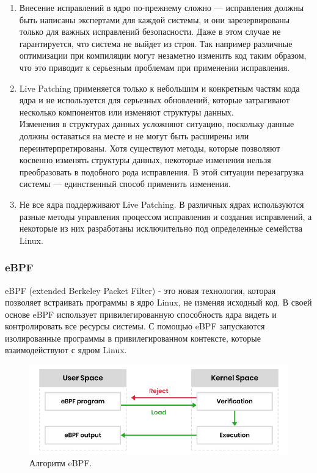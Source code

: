 \begin{enumerate}
    \item Внесение исправлений в ядро по-прежнему сложно — исправления должны быть написаны экспертами для каждой системы,
    и они зарезервированы только для важных исправлений безопасности.
    Даже в этом случае не гарантируется, что система не выйдет из строя.
    Так например различные оптимизации при компиляции могут незаметно изменить код таким образом, что это приводит к серьезным проблемам при применении исправления.\cite{livepatch-problems}
    \item Live Patching применяется только к небольшим и конкретным частям кода ядра и не используется для серьезных обновлений,
    которые затрагивают несколько компонентов или изменяют структуры данных.
    \vspace{0.5cm}\\
    Изменения в структурах данных усложняют ситуацию, поскольку данные должны оставаться на месте и не могут быть расширены или переинтерпретированы.
    Хотя существуют методы, которые позволяют косвенно изменять структуры данных, некоторые изменения нельзя преобразовать в подобного рода исправления.
    В этой ситуации перезагрузка системы — единственный способ применить изменения.
    \item Не все ядра поддерживают Live Patching.
    В различных ядрах используются разные методы управления процессом исправления и создания исправлений,
    а некоторые из них разработаны исключительно под определенные семейства Linux.\cite{infosec}
\end{enumerate}

\subsubsection{eBPF}\label{subsec:ebpf}

eBPF (extended Berkeley Packet Filter) - это новая технология, которая позволяет встраивать программы в ядро Linux, не изменяя исходный код.
В своей основе eBPF использует привилегированную способность ядра видеть и контролировать все ресурсы системы.
С помощью eBPF запускаются изолированные программы в привилегированном контексте, которые взаимодействуют с ядром Linux.

\begin{figure}[H]
    \centering
    \includegraphics[width=\textwidth]{inc/img/eBPF_work}
    \caption{Алгоритм eBPF\cite{ebpf-pic}.}
    \label{fig:eBPF_work}
\end{figure}

